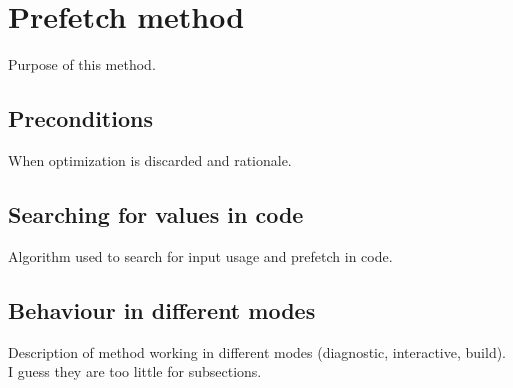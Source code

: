 \chapter{Prefetch method}
Purpose of this method.

\section{Preconditions}
When optimization is discarded and rationale.

\section{Searching for values in code}
Algorithm used to search for input usage and prefetch in code.

\section{Behaviour in different modes}
Description of method working in different modes (diagnostic, interactive, build). I guess they are too little for subsections.

